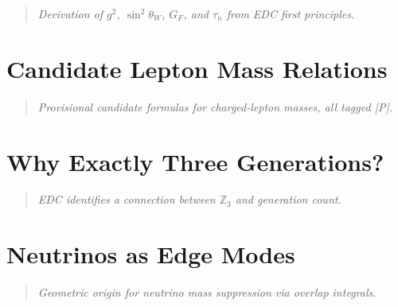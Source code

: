 \documentclass[11pt,a4paper]{book}
\theoremstyle{definition}
\theoremstyle{remark}
\begin{document}
\begin{quote}
\textit{Derivation of $g^2$, $\sin^2\theta_W$, $G_F$, and $\tau_n$ from EDC first principles.}
\end{quote}



\chapter{Candidate Lepton Mass Relations}
\label{ch:lepton_candidates}

\begin{quote}
\textit{Provisional candidate formulas for charged-lepton masses, all tagged [P].}
\end{quote}



\chapter{Why Exactly Three Generations?}
\label{ch:three_generations}

\begin{quote}
\textit{EDC identifies a connection between $\mathbb{Z}_3$ and generation count.}
\end{quote}



\chapter{Neutrinos as Edge Modes}
\label{ch:neutrinos_edge}

\begin{quote}
\textit{Geometric origin for neutrino mass suppression via overlap integrals.}
\end{quote}


\end{document}
